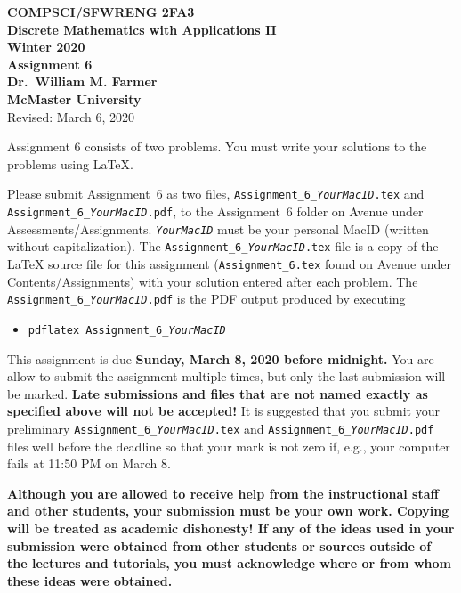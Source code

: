 \documentclass[11pt,fleqn]{article}
\begin{document}
\begin{center}

  {\large \textbf{COMPSCI/SFWRENG 2FA3}}\\[2mm]
  {\large \textbf{Discrete Mathematics with Applications II}}\\[2mm]
  {\large \textbf{Winter 2020}}\\[8mm]
  {\huge \textbf{Assignment 6}}\\[6mm]
  {\large \textbf{Dr.~William M. Farmer}}\\[2mm]
  {\large \textbf{McMaster University}}\\[6mm]
  {\large Revised: March 6, 2020}

\end{center}

\medskip

Assignment 6 consists of two problems.  You must write your solutions
to the problems using LaTeX.

Please submit Assignment~6 as two files,
\texttt{Assignment\_6\_\emph{YourMacID}.tex} and
\texttt{Assignment\_6\_\emph{YourMacID}.pdf}, to the Assignment~6
folder on Avenue under Assessments/Assignments.
\texttt{\emph{YourMacID}} must be your personal MacID (written without
capitalization).  The \texttt{Assignment\_6\_\emph{YourMacID}.tex}
file is a copy of the LaTeX source file for this assignment
(\texttt{Assignment\_6.tex} found on Avenue under
Contents/Assignments) with your solution entered after each problem.
The \texttt{Assignment\_6\_\emph{YourMacID}.pdf} is the PDF output
produced by executing

\begin{itemize}

  \item[] \texttt{pdflatex Assignment\_6\_\emph{YourMacID}}

\end{itemize}

This assignment is due \textbf{Sunday, March 8, 2020 before midnight.}
You are allow to submit the assignment multiple times, but only the
last submission will be marked.  \textbf{Late submissions and files
  that are not named exactly as specified above will not be accepted!}
It is suggested that you submit your preliminary
\texttt{Assignment\_6\_\emph{YourMacID}.tex} and
\texttt{Assignment\_6\_\emph{YourMacID}.pdf} files well before the
deadline so that your mark is not zero if, e.g., your computer fails
at 11:50 PM on March 8.

\textbf{Although you are allowed to receive help from the
  instructional staff and other students, your submission must be your
  own work.  Copying will be treated as academic dishonesty! If any of
  the ideas used in your submission were obtained from other students
  or sources outside of the lectures and tutorials, you must
  acknowledge where or from whom these ideas were obtained.}
\end{document}
